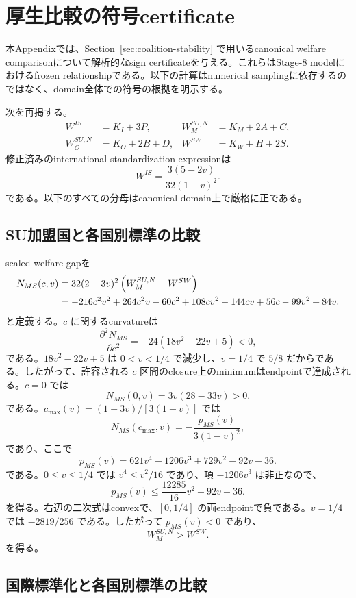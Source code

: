 \section{厚生比較の符号certificate}
\label{app:welfare}

本Appendixでは、Section~\ref{sec:coalition-stability} で用いるcanonical welfare comparisonについて解析的なsign certificateを与える。これらはStage-8 modelにおけるfrozen relationshipである。以下の計算はnumerical samplingに依存するのではなく、domain全体での符号の根拠を明示する。

次を再掲する。
\begin{align*}
W^{IS}&=K_I+3P,
& W_M^{SU,N}&=K_M+2A+C,\\
W_O^{SU,N}&=K_O+2B+D,
& W^{SW}&=K_W+H+2S.
\end{align*}
修正済みのinternational-standardization expressionは
\[
W^{IS}=\frac{3(5-2v)}{32(1-v)^2}.
\]
である。以下のすべての分母はcanonical domain上で厳格に正である。

\subsection{SU加盟国と各国別標準の比較}

scaled welfare gapを
\begin{align}
N_{MS}(c,v)
&\equiv 32(2-3v)^2\left(W_M^{SU,N}-W^{SW}\right)\notag\\
&=-216c^2v^2+264c^2v-60c^2
+108cv^2-144cv+56c
-99v^2+84v.
\label{eq:appendix-n-ms}
\end{align}
と定義する。$c$ に関するcurvatureは
\[
\frac{\partial^2N_{MS}}{\partial c^2}
=-24(18v^2-22v+5)<0,
\]
である。$18v^2-22v+5$ は $0<v<1/4$ で減少し、$v=1/4$ で $5/8$ だからである。したがって、許容される $c$ 区間のclosure上のminimumはendpointで達成される。$c=0$ では
\[
N_{MS}(0,v)=3v(28-33v)>0.
\]
である。$c_{\max}(v)=(1-3v)/[3(1-v)]$ では
\[
N_{MS}(c_{\max},v)
=-\frac{p_{MS}(v)}{3(1-v)^2},
\]
であり、ここで
\[
p_{MS}(v)=621v^4-1206v^3+729v^2-92v-36.
\]
である。$0\le v\le1/4$ では $v^4\le v^2/16$ であり、項 $-1206v^3$ は非正なので、
\[
p_{MS}(v)
\le \frac{12285}{16}v^2-92v-36.
\]
を得る。右辺の二次式はconvexで、$[0,1/4]$ の両endpointで負である。$v=1/4$ では $-2819/256$ である。したがって $p_{MS}(v)<0$ であり、
\begin{equation}
\boxed{W_M^{SU,N}>W^{SW}.}
\label{eq:appendix-su-member-gt-sw}
\end{equation}
を得る。

\subsection{国際標準化と各国別標準の比較}

